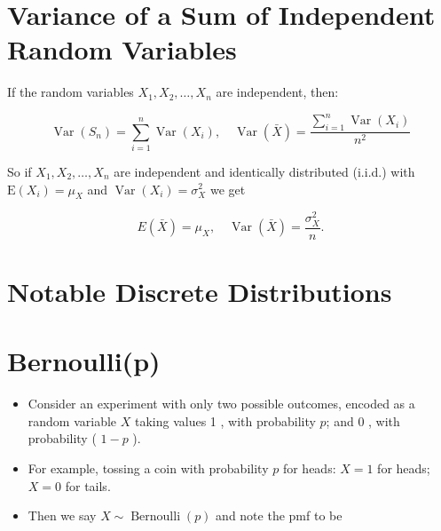 \documentclass[10pt]{article}
\begin{document}






\section*{Variance of a Sum of Independent Random Variables}
If the random variables $X_{1}, X_{2}, \ldots, X_{n}$ are independent, then:

$$
\operatorname{Var}(S_{n})=\sum_{i=1}^{n} \operatorname{Var}(X_{i}), \quad \operatorname{Var}(\bar{X})=\frac{\sum_{i=1}^{n} \operatorname{Var}(X_{i})}{n^{2}}
$$

So if $X_{1}, X_{2}, \ldots, X_{n}$ are independent and identically distributed (i.i.d.) with $\mathrm{E}(X_{i})=\mu_{X}$ and $\operatorname{Var}(X_{i})=\sigma_{X}^{2}$ we get

$$
E(\bar{X})=\mu_{X}, \quad \operatorname{Var}(\bar{X})=\frac{\sigma_{X}^{2}}{n} .
$$

\section*{Notable Discrete Distributions}
\section*{Bernoulli(p)}
\begin{itemize}
  \item Consider an experiment with only two possible outcomes, encoded as a random variable $X$ taking values 1 , with probability $p$; and 0 , with probability ( $1-p$ ).
  \item For example, tossing a coin with probability $p$ for heads: $X=1$ for heads; $X=0$ for tails.
  \item Then we say $X \sim \operatorname{Bernoulli}(p)$ and note the pmf to be
\end{itemize}
\end{document}
